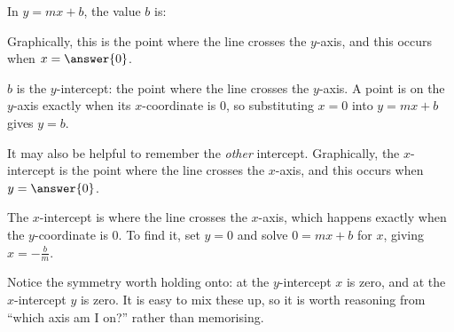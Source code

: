 \documentclass[12pt]{ximera}
\begin{document}
\begin{problem}
In $y = mx + b$, the value $b$ is:
\begin{multipleChoice}
\end{multipleChoice}

Graphically, this is the point where the line crosses the $y$-axis, and this occurs
when $x = \answer{0}$.

\begin{solution}
$b$ is the $y$-intercept: the point where the line crosses the $y$-axis. A point is on
the $y$-axis exactly when its $x$-coordinate is 0, so substituting $x = 0$ into
$y = mx + b$ gives $y = b$.
\end{solution}
\end{problem}

\begin{problem}
It may also be helpful to remember the \emph{other} intercept. Graphically, the
$x$-intercept is the point where the line crosses the $x$-axis, and this occurs when
$y = \answer{0}$.

\begin{freeResponse}
\end{freeResponse}

\begin{solution}
The $x$-intercept is where the line crosses the $x$-axis, which happens exactly when
the $y$-coordinate is 0. To find it, set $y = 0$ and solve $0 = mx + b$ for $x$, giving
$x = -\tfrac{b}{m}$.

Notice the symmetry worth holding onto: at the $y$-intercept $x$ is zero, and at the
$x$-intercept $y$ is zero. It is easy to mix these up, so it is worth reasoning from
``which axis am I on?'' rather than memorising.
\end{solution}
\end{problem}
\end{document}
